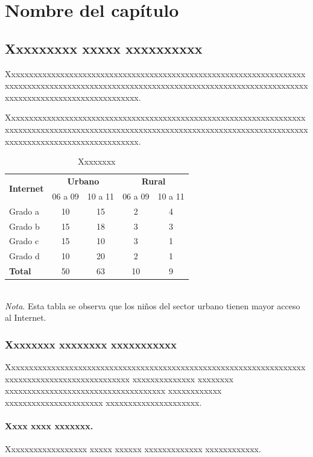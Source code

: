 \chapter{Nombre del capítulo}

\section{Xxxxxxxxx xxxxx xxxxxxxxxx}

Xxxxxxxxxxxxxxxxxxxxxxxxxxxxxxxxxxxxxxxxxxxxxxxxxxxxxxxxxxxxxxxxxxxxxxxxxxxxxxxxxxxxxxxxxxxxxxxxxxxxxxxxxxxxxxxxxxxxxxxxxxxxxxxxxxxxxxxxxxxxxxxxxxxxxxxxxxxxxxxxxxxxx.

Xxxxxxxxxxxxxxxxxxxxxxxxxxxxxxxxxxxxxxxxxxxxxxxxxxxxxxxxxxxxxxxxxxxxxxxxxxxxxxxxxxxxxxxxxxxxxxxxxxxxxxxxxxxxxxxxxxxxxxxxxxxxxxxxxxxxxxxxxxxxxxxxxxxxxxxxxxxxxxxxxxxxx.

\begin{table}[H]
\centering
\caption{Xxxxxxxx}
\label{tab:tabla1}
\begin{tabular}{@{}lcccc@{}}
\toprule
\multirow{2}{*}{\textbf{Internet}} & \multicolumn{2}{c}{\textbf{Urbano}} & \multicolumn{2}{c}{\textbf{Rural}} \\
\cmidrule(lr){2-3} \cmidrule(lr){4-5}
 & 06 a 09 & 10 a 11 & 06 a 09 & 10 a 11 \\
\midrule
Grado a & 10 & 15 & 2 & 4 \\
Grado b & 15 & 18 & 3 & 3 \\
Grado c & 15 & 10 & 3 & 1 \\
Grado d & 10 & 20 & 2 & 1 \\
\midrule
\textbf{Total} & 50 & 63 & 10 & 9 \\
\bottomrule
\end{tabular}
\vspace{0.5cm}\\
\textit{Nota}. Esta tabla se observa que los niños del sector urbano tienen mayor acceso al Internet.
\end{table}

\subsection{Xxxxxxxx xxxxxxxx xxxxxxxxxxx}

Xxxxxxxxxxxxxxxxxxxxxxxxxxxxxxxxxxxxxxxxxxxxxxxxxxxxxxxxxxxxxxxxxxxxxxxxxxxxxxxxxxxxxxxxxxxxxxx xxxxxxxxxxxxxx xxxxxxxx xxxxxxxxxxxxxxxxxxxxxxxxxxxxxxxxxxxx xxxxxxxxxxxx xxxxxxxxxxxxxxxxxxxxxx xxxxxxxxxxxxxxxxxxxxx.

\subsubsection{Xxxx xxxx xxxxxxx.} Xxxxxxxxxxxxxxxxxx xxxxx xxxxxx xxxxxxxxxxxxx xxxxxxxxxxxx.

